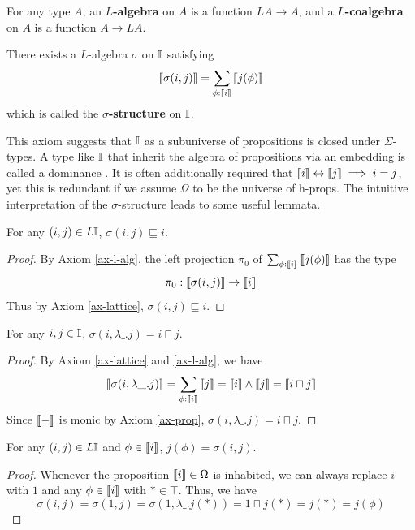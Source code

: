 \begin{definition}
    \label{def-sigma}
    For any type $A$, an \textbf{$L$-algebra} on $A$ is a function $LA\to A$, and a \textbf{$L$-coalgebra} on $A$ is a function $A\to LA$.
\end{definition}
\begin{axiom}
    \label{ax-l-alg}
    There exists a $L$-algebra $\sigma$ on $\mathbb{I}$ satisfying
    $$\left\llbracket\sigma(i,j)\right\rrbracket=\sum_{\phi:\left\llbracket i\right\rrbracket}\left\llbracket j(\phi)\right\rrbracket$$
    which is called the \textbf{$\sigma$-structure} on $\mathbb{I}$.
\end{axiom}
This axiom suggests that $\mathbb{I}$ as a subuniverse of propositions is closed under $\Sigma$-types. A type like $\mathbb{I}$ that inherit the algebra of propositions via an embedding is called a dominance \cite{reus_general_1997}. It is often additionally required that $\left\llbracket i\right\rrbracket\leftrightarrow\left\llbracket j\right\rrbracket\implies i=j$, yet this is redundant if we assume $\Omega$ to be the universe of h-props. The intuitive interpretation of the $\sigma$-structure leads to some useful lemmata.
\begin{lemma}
    \label{lemma-sigma-le}
    For any $(i,j)\in L\mathbb{I}$, $\sigma(i,j)\sqsubseteq i$.
\end{lemma}
\begin{proof}
    By Axiom \ref{ax-l-alg}, the left projection $\pi_0$ of $\sum_{\phi:\left\llbracket i\right\rrbracket}\left\llbracket j(\phi)\right\rrbracket$ has the type $$\pi_0:\left\llbracket\sigma(i,j)\right\rrbracket\to\left\llbracket i\right\rrbracket$$
    Thus by Axiom \ref{ax-lattice}, $\sigma(i,j)\sqsubseteq i$.
\end{proof}
\begin{lemma}
    \label{lemma-sigma-meet}
    For any $i,j\in\mathbb{I}$, $\sigma(i,\lambda\_.j)=i\sqcap j$.
\end{lemma}
\begin{proof}
    By Axiom \ref{ax-lattice} and \ref{ax-l-alg}, we have
    $$\left\llbracket\sigma(i,\lambda\_.j)\right\rrbracket=\sum_{\phi:\left\llbracket i\right\rrbracket}\left\llbracket j\right\rrbracket=\left\llbracket i\right\rrbracket\wedge\left\llbracket j\right\rrbracket=\left\llbracket i\sqcap j\right\rrbracket$$
    Since $\left\llbracket-\right\rrbracket$ is monic by Axiom \ref{ax-prop}, $\sigma(i,\lambda\_.j)=i\sqcap j$.
\end{proof}
\begin{lemma}
    \label{lemma-sigma-eta}
    For any $(i,j)\in L\mathbb{I}$ and $\phi\in\left\llbracket i\right\rrbracket$, $j(\phi)=\sigma(i,j)$.
\end{lemma}
\begin{proof}
    Whenever the proposition $\left\llbracket i\right\rrbracket\in\Omega$ is inhabited, we can always replace $i$ with $1$ and any $\phi\in\left\llbracket i\right\rrbracket$ with $*\in\top$. Thus, we have
    $$\sigma(i,j)=\sigma(1,j)=\sigma(1,\lambda\_.j(*))=1\sqcap j(*)=j(*)=j(\phi)$$
\end{proof}

